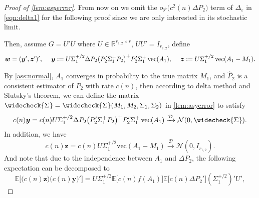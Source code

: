 \documentclass[12pt]{article}
\numberwithin{equation}{section}
\numberwithin{table}{section}
\numberwithin{thm}{section}
\numberwithin{defn}{section}
\numberwithin{lem}{section}
\numberwithin{prop}{section}
\numberwithin{cor}{section}
\numberwithin{rem}{section}
\DeclareMathOperator{\Vector}{vec}
\begin{document}
\begin{appendix}
\begin{proof}[Proof of \autoref{lem:asyerror}]
From now on we omit the $o_{\mathcal{P}}\big(c^2(n) \Delta P_2\big)$ term of $\Delta_\varepsilon$ in \eqref{eqn:delta1} for the following proof since we are only interested in its stochastic limit.

Then, assume $G = U' U$ where $U \in \mathbb{R}^{r_{1,2} \times r}$, $U U' = I_{r_{1,2}}$, define
$$
\bm{w} = (\bm{y}', \bm{z}')', \hspace{0.45cm} \bm{y} := U \Sigma_1^{+/2} \Delta P_2 \big(P_2' \Sigma_1^+ P_2\big)^+ P_2' \Sigma_1^{+} \Vector(A_1), \hspace{0.45cm} \bm{z} := U \Sigma_1^{+/2} \Vector(A_1 - M_1).
$$

By \autoref{ass:normal}, $A_1$ converges in probability to the true matrix $M_1$, and $\widehat{P}_2$ is a consistent estimator of $P_2$ with rate $c(n)$, then according to delta method and Slutsky's theorem, we can define the matrix $\widecheck{\Sigma} = \widecheck{\Sigma}(M_1, M_2, \Sigma_1, \Sigma_2)$ in \autoref{lem:asyerror} to satisfy
$$
c(n) \bm{y} = c(n) U \Sigma_1^{+/2} \Delta P_2 \big(P_2' \Sigma_1^+ P_2\big)^+ P_2' \Sigma_1^{+} \Vector(A_1) \xrightarrow{\mathcal{D}} \mathcal{N}(0, \widecheck{\Sigma}).
$$
In addition, we have
$$
c(n) \bm{z} = c(n) U \Sigma_1^{+/2} \mbox{vec}(A_1 - M_1) \xrightarrow{\mathcal{D}} \mathcal{N}(0, I_{r_{1,2}}).
$$
And note that due to the independence between $A_1$ and $\Delta P_2$, the following expectation can be decomposed to
\begin{equation}\label{eqn:expProd}
    \mathbb{E}\Big[\big(c(n) \bm{z}\big) \big(c(n) \bm{y}\big)'\Big] = U \Sigma_1^{+/2} \mathbb{E} \bigg[ c(n) f(A_1) \bigg] \mathbb{E}\big[c(n) \Delta P_2' \big] (\Sigma_1^{+/2})' U',
\end{equation}


\end{proof}
\end{appendix}
\end{document}
